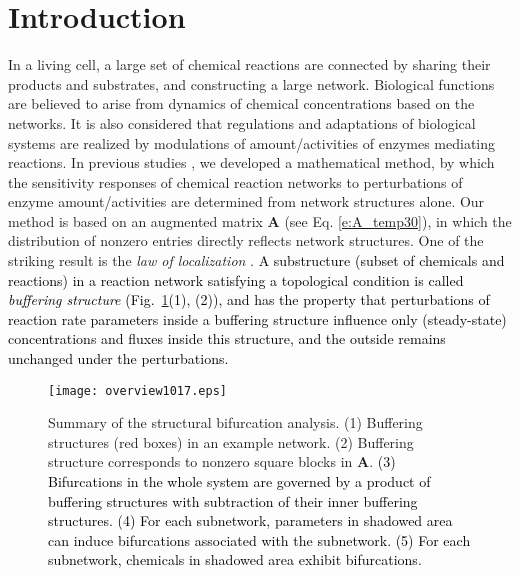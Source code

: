 \documentclass[ amsmath,amssymb,nofootinbib
]{revtex4-1}
\newcommand{\corr}[1]{\textcolor{black}{#1}}
\begin{document}




\section{ Introduction}In a living cell, a large set of chemical reactions are connected by sharing their products and substrates, and constructing a large network.
Biological functions are believed to  arise from dynamics of chemical concentrations based on the networks. 
It is also considered that regulations and adaptations of biological systems are realized by modulations of amount/activities of enzymes mediating reactions.
In previous studies \cite{Mochizuki, OM}, we developed a mathematical method, by which the sensitivity responses of chemical reaction networks to perturbations of enzyme amount/activities are determined from network structures alone. 
Our method is based on an augmented matrix {\bf A} (see Eq. \eqref{e:A_temp30}), in which the distribution of nonzero entries directly reflects  network structures. 
One of the striking result is the {\it law of localization} \cite{OM}. \corr{ A substructure (subset of chemicals and reactions) in a reaction network satisfying a topological condition is called {\it buffering structure} (Fig.~\ref{fig:ov}(1), (2)), and  has the property that  perturbations of reaction rate parameters inside a buffering structure influence   only (steady-state) concentrations and fluxes inside this structure, and the outside remains unchanged under the perturbations.}%



\begin{figure}[h!tb]
\texttt{[image: overview1017.eps]}
\caption{Summary of the structural bifurcation analysis. 
(1)  { Buffering structures (red boxes) in an example network.} 
(2) { Buffering structure corresponds to nonzero square blocks  in {\bf A}}. 
\corr{
(3) Bifurcations  {in the whole system are} governed by a product of buffering structures with subtraction of their inner buffering structures. %
(4) For each subnetwork, { parameters in shadowed area can induce bifurcations associated with the subnetwork}.
(5) For each subnetwork, { chemicals in shadowed area exhibit bifurcations}. 
}
}
\label{fig:ov}
\end{figure}
\end{document}
